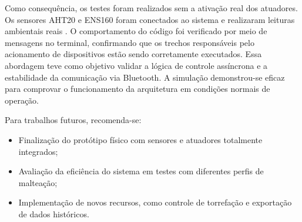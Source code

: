 Como consequência, os testes foram realizados sem a ativação real dos atuadores. Os sensores AHT20 e ENS160 foram conectados ao sistema e realizaram leituras ambientais reais 
. O comportamento do código foi verificado por meio de mensagens no terminal, confirmando que os trechos responsáveis pelo acionamento de dispositivos estão sendo corretamente executados. Essa abordagem teve como objetivo validar a lógica de controle assíncrona e a estabilidade da comunicação via Bluetooth. A simulação demonstrou-se eficaz para comprovar o funcionamento da arquitetura em condições normais de operação.
  

  
Para trabalhos futuros, recomenda-se:
  
  \begin{itemize}
      \item Finalização do protótipo físico com sensores e atuadores totalmente integrados;
      \item Avaliação da eficiência do sistema em testes com diferentes perfis de malteação;
      \item Implementação de novos recursos, como controle de torrefação e exportação de dados históricos.
  \end{itemize}